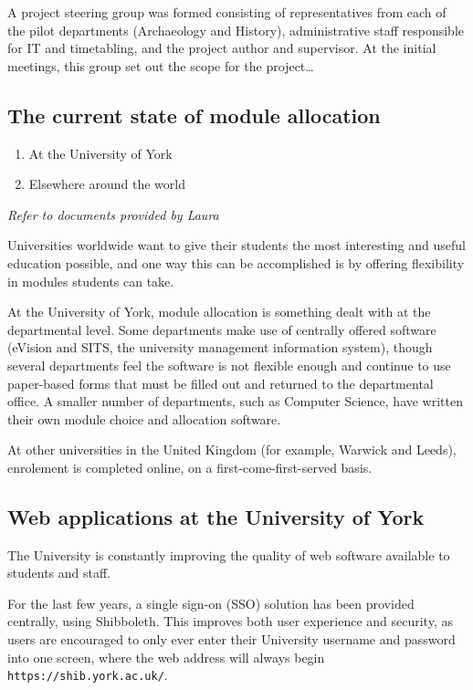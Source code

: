\documentclass[]{scrartcl}
\begin{document}
A project steering group was formed consisting of representatives from each of the pilot departments (Archaeology and History), administrative staff responsible for IT and timetabling, and the project author and supervisor. At the initial meetings, this group set out the scope for the project…

\subsection{The current state of module allocation}

\begin{enumerate}
  \item At the University of York
  \item Elsewhere around the world
\end{enumerate}

\textit{Refer to documents provided by Laura}

Universities worldwide want to give their students the most interesting and useful education possible, and one way this can be accomplished is by offering flexibility in modules students can take.

At the University of York, module allocation is something dealt with at the departmental level. Some departments make use of centrally offered software (eVision and SITS, the university management information system), though several departments feel the software is not flexible enough and continue to use paper-based forms that must be filled out and returned to the departmental office. A smaller number of departments, such as Computer Science, have written their own module choice and allocation software.

At other universities in the United Kingdom (for example, Warwick and Leeds), enrolement is completed online, on a first-come-first-served basis.

\subsection{Web applications at the University of York}


The University is constantly improving the quality of web software available
to students and staff.

For the last few years, a single sign-on (SSO) solution has been provided
centrally, using Shibboleth. This improves both user experience and security,
as users are encouraged to only ever enter their University username and
password into one screen, where the web address will always begin
\texttt{https://shib.york.ac.uk/}.
\end{document}
